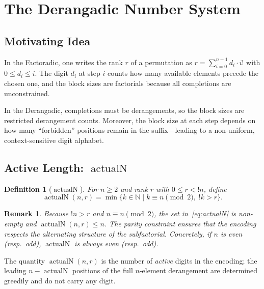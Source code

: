 \documentclass[11pt,a4paper]{article}
\newtheorem{definition}{Definition}[section]
\newtheorem{remark}{Remark}[section]
\newcommand{\subfact}[1]{!{#1}} %
\newcommand{\actualN}{\operatorname{actualN}}
\begin{document}
    \section{The Derangadic Number System}
    \label{sec:system}

    \subsection{Motivating Idea}

    In the Factoradic, one writes the rank $r$ of a permutation as
    $r = \sum_{i=0}^{n-1} d_i \cdot i!$ with $0 \leq d_i \leq i$. The digit
    $d_i$ at step $i$ counts how many available elements precede the chosen
    one, and the block sizes are factorials because all completions are
    unconstrained.

    In the Derangadic, completions must be derangements, so the block sizes are
    restricted derangement counts. Moreover, the block size at each step
    depends on how many ``forbidden'' positions remain in the suffix---leading to
    a non-uniform, context-sensitive digit alphabet.

    \subsection{Active Length: $\actualN$}

    \begin{definition}[$\actualN$]
        \label{def:actualN}
        For $n \geq 2$ and rank $r$ with $0 \leq r < \subfact{n}$, define
        \begin{equation}
            \actualN(n,r) = \min\bigl\{ k \in \mathbb{N} \;\big|\;
            k \equiv n \pmod{2},\; \subfact{k} > r \bigr\}.
            \label{eq:actualN}
        \end{equation}
    \end{definition}

    \begin{remark}
        Because $\subfact{n} > r$ and $n \equiv n \pmod{2}$, the set in~\eqref{eq:actualN}
        is non-empty and $\actualN(n,r) \leq n$. The parity constraint ensures that
        the encoding respects the alternating structure of the subfactorial.
        Concretely, if $n$ is even (resp.\ odd), $\actualN$ is always even (resp.\
        odd).
    \end{remark}

    The quantity $\actualN(n,r)$ is the number of \emph{active} digits in the
    encoding; the leading $n - \actualN$ positions of the full $n$-element
    derangement are determined greedily and do not carry any digit.
\end{document}

